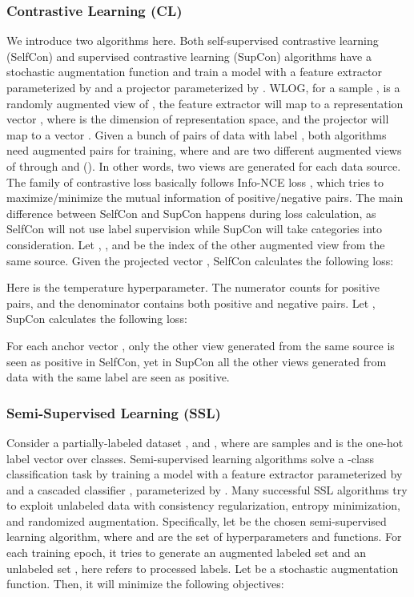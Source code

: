 \documentclass[letterpaper]{article} \usepackage{aaai22}  \usepackage{times}  \usepackage{helvet}  \usepackage{courier}  \usepackage[hyphens]{url}  \usepackage{graphicx} \usepackage{subfigure}
\begin{document}
\subsubsection{Contrastive Learning (CL)}
We introduce two algorithms here. Both self-supervised contrastive learning (SelfCon) and supervised contrastive learning (SupCon) algorithms have a stochastic augmentation function  and train a model  with a feature extractor  parameterized by  and a projector  parameterized by . WLOG, for a sample ,  is a randomly augmented view of , the feature extractor will map  to a representation vector , where  is the dimension of representation space, and the projector will map  to a vector . Given a bunch of  pairs of data with label , both algorithms need  augmented pairs  for training, where  and  are two different augmented views of  through  and (). In other words, two views are generated for each data source. The family of contrastive loss basically follows Info-NCE loss \cite{oord2018representation}, which tries to maximize/minimize the mutual information of positive/negative pairs. The main difference between SelfCon and SupCon happens during loss calculation, as SelfCon will not use label supervision while SupCon will take categories into consideration. Let , , and  be the index of the other augmented view from the same source. Given the projected vector , SelfCon calculates the following loss:

Here  is the temperature hyperparameter. The numerator counts for positive pairs, and the denominator contains both positive and negative pairs. Let , SupCon calculates the following loss:

For each anchor vector , only the other view generated from the same source  is seen as positive in SelfCon, yet in SupCon all the other views generated from data with the same label are seen as positive.
\subsubsection{Semi-Supervised Learning (SSL)}
Consider a partially-labeled dataset ,  and , where  are samples and  is the one-hot label vector over  classes. Semi-supervised learning algorithms solve a -class classification task by training a model  with a feature extractor  parameterized by  and a cascaded classifier , parameterized by . Many successful SSL algorithms try to exploit unlabeled data with consistency regularization, entropy minimization, and randomized augmentation. Specifically, let  be the chosen semi-supervised learning algorithm, where  and  are the set of hyperparameters and functions. For each training epoch, it tries to generate an augmented labeled set  and an unlabeled set , here  refers to processed labels. Let  be a stochastic augmentation function. Then, it will minimize the following objectives:
\end{document}
